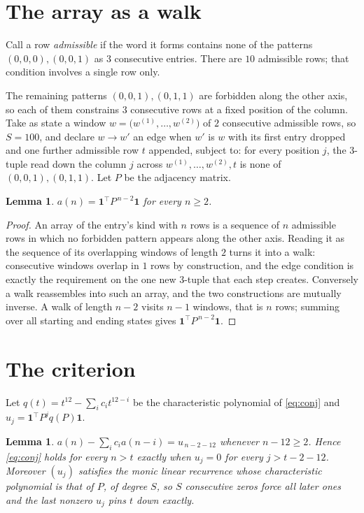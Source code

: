 \documentclass[11pt,a4paper]{article}
\theoremstyle{plain}
\newtheorem{lemma}[theorem]{Lemma}
\theoremstyle{definition}
\begin{document}
\section{The array as a walk}

Call a row \emph{admissible} if the word it forms contains none of the patterns
$(0,0,0), (0,0,1)$ as $3$ consecutive entries. There are $10$ admissible rows; that condition
involves a single row only.

The remaining patterns $(0,0,1), (0,1,1)$ are forbidden along the other axis, so each of them
constrains $3$ consecutive rows at a fixed position of the column. Take as state a
window $w=\bigl(w^{(1)},\dots,w^{(2)}\bigr)$ of $2$ consecutive admissible
rows, so $S=100$, and declare $w\to w'$ an edge when $w'$ is $w$ with its first entry
dropped and one further admissible row $t$ appended, subject to: for every position
$j$, the $3$-tuple read down the column $j$ across $w^{(1)},\dots,w^{(2)},t$
is none of $(0,0,1), (0,1,1)$. Let $P$ be the adjacency matrix.

\begin{lemma}\label{lem:walk}
$a(n)=\mathbf{1}^{\!\top}P^{\,n-2}\mathbf{1}$ for every $n\ge2$.
\end{lemma}

\begin{proof}
An array of the entry's kind with $n$ rows is a sequence of $n$ admissible rows in
which no forbidden pattern appears along the other axis. Reading it as the sequence of its
overlapping windows of length $2$ turns it into a walk: consecutive windows overlap in
$1$ rows by construction, and the edge condition is exactly the requirement on the one
new $3$-tuple that each step creates. Conversely a walk reassembles into such an array,
and the two constructions are mutually inverse. A walk of length $n-2$ visits $n-1$
windows, that is $n$ rows; summing over all starting and ending states gives
$\mathbf{1}^{\!\top}P^{\,n-2}\mathbf{1}$.
\end{proof}

\section{The criterion}

Let $q(t)=t^{12}-\sum_i c_i t^{12-i}$ be the characteristic polynomial of
\eqref{eq:conj} and $u_j=\mathbf{1}^{\!\top}P^{j}q(P)\mathbf{1}$.

\begin{lemma}\label{lem:crit}
$a(n)-\sum_i c_i a(n-i)=u_{\,n-2-12}$ whenever $n-12\ge2$. Hence
\eqref{eq:conj} holds for every $n>t$ exactly when $u_j=0$ for every
$j>t-2-12$. Moreover $(u_j)$ satisfies the monic linear recurrence whose
characteristic polynomial is that of $P$, of degree $S$, so $S$ consecutive zeros force all
later ones and the last nonzero $u_j$ pins $t$ down exactly.
\end{lemma}
\end{document}
